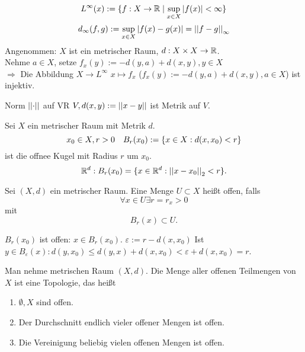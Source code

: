 \documentclass[../ana2.tex]{subfiles}
\begin{document}
\begin{bsp}
    \[ L^\infty(x) := \{f:X\rightarrow \mathbb{R} 
    \; \vert \; \underset{x\in X}{\sup} \left|f(x)\right| < \infty\} \]
    \[ d_\infty(f, g) := \underset{x\in X}{\sup} 
    \left| f(x) - g(x) \right| = \left|\left|f-g\right|\right|_\infty \]
    Angenommen: \(X\) ist ein metrischer Raum, 
    \( d:X \times X\rightarrow \mathbb{R} \). \\
    Nehme \( a \in X \), setze 
    \( f_x(y) := -d(y,a) + d(x,y), y \in X \) \\
    \( \Rightarrow \) Die Abbildung \( X \rightarrow L^\infty \)
    \( x \mapsto f_x \) (\( f_x(y) := 
    -d(y,a) + d(x,y), a \in X \))
    ist injektiv.
\end{bsp}
\begin{bsp}
    Norm \( \left|\left|\cdot\right|\right| \) auf VR \( V, 
    d(x,y) := \left|\left|x-y\right|\right| \) ist Metrik auf 
    \(V\).
\end{bsp}
\begin{defi}
    Sei \(X\) ein metrischer Raum mit Metrik \(d\).
    \[ x_0 \in X, r > 0 \quad B_r(x_0) 
    := \{ x\in X: d(x, x_0) < r \} \] 
    ist die offnee Kugel mit Radius \(r\) um \(x_0\).
    \[ \mathbb{R}^d: B_r(x_0) = \{x \in \mathbb{R}^d: 
    \left|\left|x - x_0\right|\right|_2 < r\}. \]
\end{defi}
\begin{defi}
    Sei \( (X,d) \) ein metrischer Raum. Eine Menge 
    \( U \subset X \) heißt offen, falls 
    \[ \forall x\in U \exists r = r_x > 0 \]
    mit 
    \[ B_r(x) \subset U. \]
\end{defi}
\begin{bsp}
    \( B_r(x_0) \) ist offen: 
    \( x \in B_r(x_0) \).
    \( \varepsilon := r - d(x, x_0) \)
    Ist \( y \in B_\varepsilon(x): d(y, x_0) 
    \leq d(y, x) + d(x, x_0) < \varepsilon 
    + d(x, x_0) = r \).
\end{bsp}
\begin{satz}[Topologie]
    Man nehme metrischen Raum \( (X, d) \).
    Die Menge aller offenen Teilmengen von \(X\) 
    ist eine Topologie, das heißt
    \begin{enumerate}[label=(\alph*)]
        \item \( \emptyset, X \) sind offen.
        \item Der Durchschnitt endlich vieler
        offener Mengen ist offen.
        \item Die Vereinigung beliebig vielen offenen
        Mengen ist offen. 
    \end{enumerate}    
\end{satz}
\end{document}
